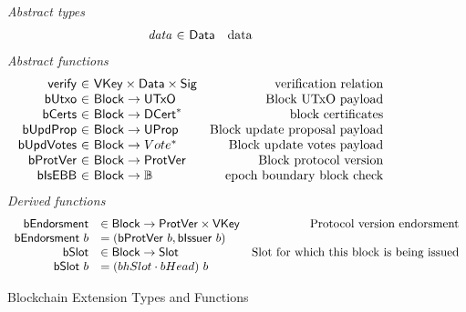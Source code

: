 \documentclass[11pt,a4paper]{article}
\newcommand{\var}[1]{\mathit{#1}}
\newcommand{\fun}[1]{\mathsf{#1}}
\newcommand{\type}[1]{\mathsf{#1}}
\newcommand{\seqof}[1]{#1^{*}}
\newcommand{\totalf}{\to}
\newcommand{\Slot}{\type{Slot}}
\newcommand{\Block}{\type{Block}}
\newcommand{\DCert}{\type{DCert}}
\newcommand{\VKey}{\type{VKey}}
\newcommand{\Sig}{\type{Sig}}
\newcommand{\Data}{\type{Data}}
\newcommand{\verifyname}{verify}
\newcommand{\isebbname}{bIsEBB}
\newcommand{\bcertsname}{bCerts}
\newcommand{\bissuername}{bIssuer}
\newcommand{\bissuer}[1]{\fun{\bissuername} ~ #1}
\begin{document}
\begin{figure}[ht]
  \emph{Abstract types}
  \begin{equation*}
  \begin{array}{r@{~\in~}lr}
    \var{data} & \Data    & \text{data}
  \end{array}
  \end{equation*}
  \emph{Abstract functions}
  \begin{equation*}
  \begin{array}{r@{~\in~}lr}
    \fun{\verifyname} & \VKey \times \Data \times \Sig
      & \text{verification relation} \\
    \fun{bUtxo} & \Block \totalf \UTxO & \text{Block UTxO payload} \\
    \fun{\bcertsname} & \Block \totalf \seqof{\DCert}
      & \text{block certificates} \\
    \fun{bUpdProp} & \Block \totalf \UProp & \text{Block update proposal payload} \\
    \fun{bUpdVotes} & \Block \totalf \seqof{Vote} & \text{Block update votes payload} \\
    \fun{bProtVer} & \Block \totalf \ProtVer & \text{Block protocol version} \\
    \fun{\isebbname} & \Block \totalf \mathbb{B} & \text{epoch boundary block check} \\
  \end{array}
  \end{equation*}
  \emph{Derived functions}
  \begin{equation*}
    \begin{array}{rlr}
      \fun{bEndorsment} & \in \Block \to \ProtVer \times \VKey & \text{Protocol version endorsment} \\
      \bendorsment{b} & = (\bprotver{b}, \bissuer{b}) \\
      \fun{\bslotname} & \in \Block \to \Slot & \text{Slot for which this block is being issued} \\
      \bslot{b} & = (\bhslotname \cdot \bheadname)~b
    \end{array}
  \end{equation*}

  \caption{Blockchain Extension Types and Functions}
  \label{fig:defs:chain-extension}
\end{figure}
\end{document}
